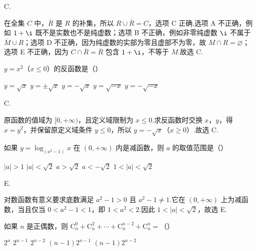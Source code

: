 \documentclass[UTF8,a4paper,oneside,11pt]{ctexbook}
\begin{document}
\begin{answer}
C.
\end{answer}

\begin{solution}
在全集 \(C\) 中，\(\overline{R}\) 是 \(R\) 的补集，所以 \(R\cup\overline{R}=C\)，选项 C 正确.选项 A 不正确，例如 \(1+\i\) 既不是实数也不是纯虚数；选项 B 不正确，例如非零纯虚数 \(\i\) 不属于 \(\overline M\cup R\)；选项 D 不正确，因为纯虚数的实部为零且虚部不为零，故 \(M\cap R=\varnothing\)；选项 E 不正确，因为 \(C\cap\overline R=\overline R\) 包含 \(1+\i\)，不等于 \(M\).故选 C.
\end{solution}

\begin{problem}

\(y = x^{2}\)（\(x \leqslant 0\)）的反函数是（\quad）

\choicesfive
    {\(y=\sqrt{x} \)}
    {\(y=\pm\sqrt{x} \)}
    {\(y=-\sqrt{x} \)}
    {\(y = \sqrt{-x} \)}
    {\(y = -\sqrt{-x} \)}
\end{problem}

\begin{answer}
C.
\end{answer}

\begin{solution}
原函数的值域为 \([0,+\infty)\)，且定义域限制为 \(x\leqslant0\).求反函数时交换 \(x\)，\(y\)，得 \(x=y^{2}\)，并保留原定义域条件 \(y\leqslant0\)，所以 \(y=-\sqrt{x}\)（\(x\geqslant0\)）.故选 C.
\end{solution}

\begin{problem}

如果 \(y = \log_{(a^2 - 1)} x \) 在 \((0, +\infty) \) 内是减函数，则 \(a \) 的取值范围是（\quad）

\choicesfive
    {\(|a| > 1 \)}
    {\(|a| < \sqrt{2} \)}
    {\(a > \sqrt{2} \)}
    {\(a < -\sqrt{2} \)}
    {\(1 < |a| < \sqrt{2} \)}
\end{problem}

\begin{answer}
E.
\end{answer}

\begin{solution}
对数函数有意义要求底数满足 \(a^{2}-1>0\) 且 \(a^{2}-1\ne1\).它在 \((0,+\infty)\) 上为减函数，当且仅当 \(0<a^{2}-1<1\)，即 \(1<a^{2}<2\).因此 \(1<|a|<\sqrt2\)，故选 E.
\end{solution}

\begin{problem}

如果 \(n\) 是正偶数，则 \(\mathrm C_{n}^{0} + \mathrm C_{n}^{2} + \cdots + \mathrm C_{n}^{n-2} + \mathrm C_{n}^{n} = \)（\quad）

\choicesfive
    {\(2^{n} \)}
    {\(2^{n-1} \)}
    {\(2^{n-2} \)}
    {\((n-1)2^{n-1} \)}
    {\((n-1)2^{n-2} \)}
\end{problem}
\end{document}
